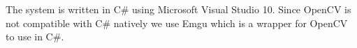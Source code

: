 The system is written in C\# using Microsoft Visual Studio 10. Since OpenCV\cite{opencv} is not compatible with C\# natively we use Emgu\cite{emgu} which is a wrapper for OpenCV to use in C\#. 


